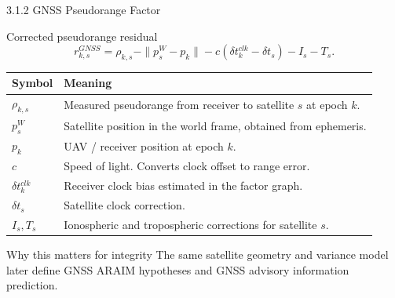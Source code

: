 \documentclass[10pt,aspectratio=169,xcolor=dvipsnames]{beamer}
\begin{document}
\begin{frame}{3.1.2 GNSS Pseudorange Factor}
  \small
  \begin{block}{Corrected pseudorange residual}
    \[
      r^{GNSS}_{k,s}
      =\rho_{k,s}
      -\|p^W_s-p_k\|
      -c\left(\delta t^{clk}_k-\delta t_s\right)
      -I_s-T_s.
    \]
  \end{block}

  \begin{table}\scriptsize
    \begin{tabular}{p{} p{}}
      \toprule
      \textbf{Symbol} & \textbf{Meaning}\\
      \midrule
      $\rho_{k,s}$ & Measured pseudorange from receiver to satellite $s$ at epoch $k$.\\
      $p^W_s$ & Satellite position in the world frame, obtained from ephemeris.\\
      $p_k$ & UAV / receiver position at epoch $k$.\\
      $c$ & Speed of light. Converts clock offset to range error.\\
      $\delta t^{clk}_k$ & Receiver clock bias estimated in the factor graph.\\
      $\delta t_s$ & Satellite clock correction.\\
      $I_s,T_s$ & Ionospheric and tropospheric corrections for satellite $s$.\\
      \bottomrule
    \end{tabular}
  \end{table}

  \begin{exampleblock}{Why this matters for integrity}
    \footnotesize The same satellite geometry and variance model later define GNSS ARAIM hypotheses and GNSS advisory information prediction.
  \end{exampleblock}
\end{frame}
\end{document}
